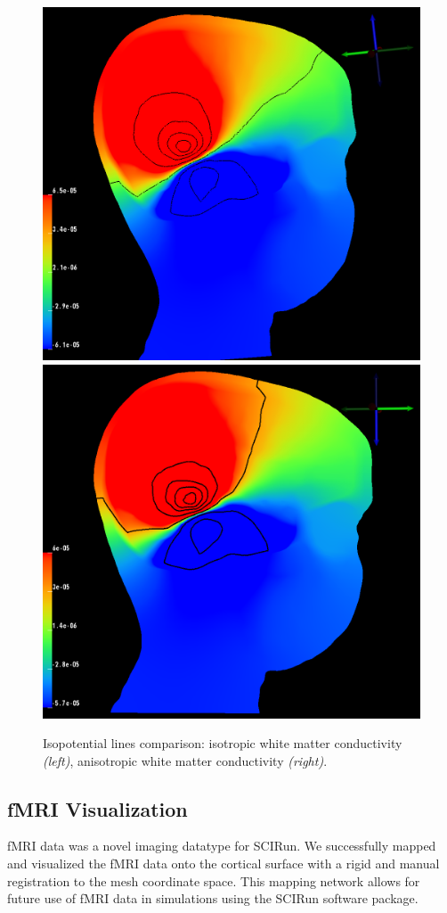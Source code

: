 \begin{figure}[H]
\begin{center}
\includegraphics[width=.49\textwidth]{Figures/iso_isolines}
\includegraphics[width = .49\textwidth]{Figures/aniso_isolines}
\caption{Isopotential lines comparison: isotropic white matter conductivity \textit{(left)}, anisotropic white matter conductivity \textit{(right)}.}
\label{fig:isolines}
\end{center}
\end{figure}

\subsection{fMRI Visualization}

fMRI data was a novel imaging datatype for SCIRun. We successfully mapped and visualized the fMRI data onto the cortical surface with a rigid and manual registration to the mesh coordinate space. This mapping network allows for future use of fMRI data in simulations using the SCIRun software package.


